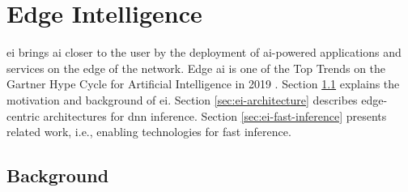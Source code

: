 \hypertarget{Edge Intelligence}{%
	\chapter{Edge Intelligence}\label{ch:edgeintelligence}}

\acrfull{ei} brings \gls{ai} closer to the user by the deployment of \gls{ai}-powered applications and services on the edge of the network. Edge \gls{ai} is one of the Top Trends on the Gartner Hype Cycle for Artificial Intelligence in 2019 \cite{goasduff_top_2019}. Section \ref{sec:ei-background} explains the motivation and background of \gls{ei}. Section \ref{sec:ei-architecture} describes edge-centric architectures for \gls{dnn} inference. Section \ref{sec:ei-fast-inference} presents related work, i.e., enabling technologies for fast inference.

\section{Background}\label{sec:ei-background}

